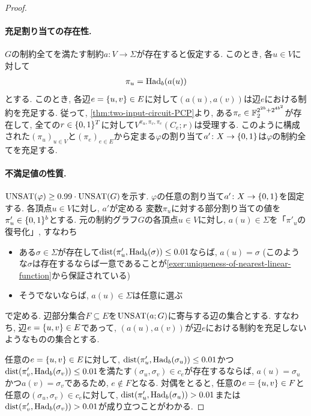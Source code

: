 \begin{proof}
  \paragraph*{充足割り当ての存在性.}
  $G$の制約全てを満たす制約$a\colon V\to\Sigma$が存在すると仮定する.
  このとき, 各$u\in V$に対して
  \begin{align*}
    \pi_u = \mathrm{Had}_b(a(u))
  \end{align*}
  とする. このとき, 各辺$e=\qty{u,v}\in E$に対して$(a(u),a(v))$は辺$e$における制約を充足する.
  従って, \cref{thm:two-input-circuit-PCP}より, ある$\pi_e\in \mathbb{F}_2^{2^{2b} + 2^{4b^2}}$が存在して, 全ての$r\in\{0,1\}^T$に対して$V^{\pi_u,\pi_v,\pi_e}(C_e;r)$は受理する.
  このように構成された$(\pi_u)_{u\in V}$と$(\pi_e)_{e\in E}$から定まる$\varphi$の割り当て$a'\colon X\to \{0,1\}$は$\varphi$の制約全てを充足する.

  \paragraph*{不満足値の性質.}
 $\mathrm{UNSAT}(\varphi)\ge 0.99\cdot\mathrm{UNSAT}(G)$を示す.
  $\varphi$の任意の割り当て$a'\colon X\to\{0,1\}$を固定する.
  各頂点$u\in V$に対し, $a'$が定める
  変数$\pi_u$に対する部分割り当ての値を$\pi'_u\in\{0,1\}^b$とする.
  元の制約グラフ$G$の各頂点$u\in V$に対し, $a(u)\in\Sigma$を「$\pi'_u$の復号化」, すなわち
  \begin{itemize}
    \item ある$\sigma\in\Sigma$が存在して$\mathrm{dist}(\pi'_u,\mathrm{Had}_b(\sigma)) \le 0.01$ならば, $a(u)=\sigma$ (このような$\sigma$は存在するならば一意であることが\cref{exer:uniqueness-of-nearest-linear-function}から保証されている)
    \item そうでないならば, $a(u)\in\Sigma$は任意に選ぶ
  \end{itemize}
  で定める.
  辺部分集合$F\subseteq E$を$\mathrm{UNSAT}(a;G)$に寄与する辺の集合とする. すなわち, 辺$e=\qty{u,v}\in E$であって, $(a(u),a(v))$が辺$e$における制約を充足しないようなものの集合とする.

  任意の$e=\qty{u,v}\in E$に対して, $\mathrm{dist}(\pi'_u,\mathrm{Had}_b(\sigma_u))\le0.01$かつ$\mathrm{dist}(\pi'_v,\mathrm{Had}_b(\sigma_v))\le0.01$を満たす$(\sigma_u,\sigma_v)\in c_e$が存在するならば, 
  $a(u)=\sigma_u$かつ$a(v)=\sigma_v$であるため, $e\not\in F$となる.
  対偶をとると, 任意の$e=\qty{u,v}\in F$と
    任意の$(\sigma_u,\sigma_v)\in c_e$に対して, $\mathrm{dist}(\pi'_u,\mathrm{Had}_b(\sigma_u))>0.01$または$\mathrm{dist}(\pi'_v,\mathrm{Had}_b(\sigma_v))>0.01$が成り立つことがわかる.
  

\end{proof}
